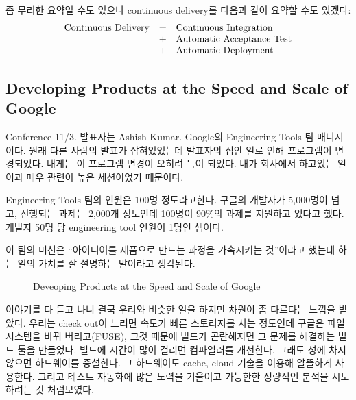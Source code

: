 \documentclass[11pt]{article}
\begin{document}
좀 무리한 요약일 수도 있으나 continuous delivery를 다음과 같이 요약할 수도 
있겠다:
\[
\begin{array}{rcl}
    \textrm{Continuous Delivery} & = & \textrm{Continuous Integration} \\
                               & + & \textrm{Automatic Acceptance Test} \\
                               & + & \textrm{Automatic Deployment}
\end{array}
\]


\subsection{Developing Products at the Speed and Scale of Google}

Conference 11/3.
발표자는 Ashish Kumar. Google의 Engineering Tools 팀 매니저이다.
원래 다른 사람의 발표가 잡혀있었는데 발표자의 집안 일로 인해 프로그램이 
변경되었다. 내게는 이 프로그램 변경이 오히려 득이 되었다.
내가 회사에서 하고있는 일이과 매우 관련이 높은 세션이었기 때문이다.

Engineering Tools 팀의 인원은 100명 정도라고한다. 
구글의 개발자가 5,000명이 넘고, 진행되는 과제는
2,000개 정도인데 100명이 90\%의 과제를 지원하고 있다고 했다. 
개발자 50명 당 engineering tool 인원이 1명인 셈이다.

 
이 팀의 미션은 ``아이디어를 제품으로 만드는 과정을 가속시키는
것''이라고 했는데 하는 일의 가치를 잘 설명하는 말이라고 생각된다.

\begin{figure}[t]
    \begin{Frame}
        \begin{center}
        \end{center}
    \end{Frame}
    \caption{Deveoping Products at the Speed and Scale of Google}
    \label{google}
\end{figure}
 
이야기를 다 듣고 나니 결국 우리와 비슷한 일을 하지만 차원이 좀 다르다는
느낌을 받았다. 우리는 check out이 느리면 속도가 빠른 스토리지를 사는
정도인데 구글은 파일시스템을 바꿔 버리고(FUSE), 그것 때문에 빌드가 곤란해지면
그 문제를 해결하는 빌드 툴을 만들었다. 빌드에 시간이 많이 걸리면
컴파일러를 개선한다. 그래도 성에 차지 않으면 하드웨어를 증설한다. 그
하드웨어도 cache, cloud 기술을 이용해 알뜰하게 사용한다. 그리고
테스트 자동화에 많은 노력을 기울이고 가능한한 정량적인 분석을 시도하려는 것 처럼보였다.
\end{document}
